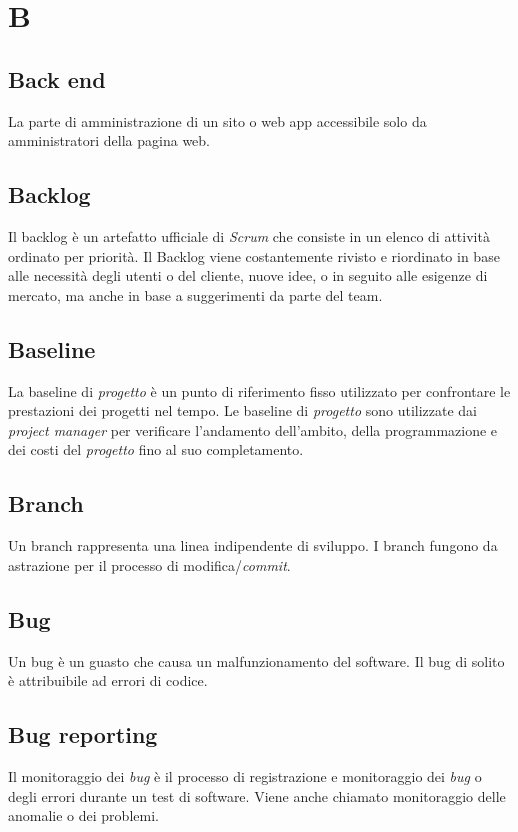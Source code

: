 \chapter{B}
\section{Back end}\label{sec:Back-end}
La parte di amministrazione di un sito o web app accessibile solo da amministratori della pagina web.

\section{Backlog}
Il backlog è un artefatto ufficiale di \emph{Scrum} che consiste in un elenco di attività ordinato per priorità. Il Backlog viene costantemente rivisto e riordinato in base alle necessità degli utenti o del cliente, nuove idee, o in seguito alle esigenze di mercato, ma anche in base a suggerimenti da parte del team.

\section{Baseline}
La baseline di \emph{progetto} è un punto di riferimento fisso utilizzato per confrontare le prestazioni dei progetti nel tempo. Le baseline di \emph{progetto} sono utilizzate dai \emph{project manager} per verificare l'andamento dell'ambito, della programmazione e dei costi del \emph{progetto} fino al suo completamento.

\section{Branch}
Un branch rappresenta una linea indipendente di sviluppo. I branch fungono da astrazione per il processo di modifica/\emph{commit}.

\section{Bug}\label{sec:Bugs}
Un bug è un guasto che causa un malfunzionamento del software. Il bug di solito è attribuibile ad errori di codice.

\section{Bug reporting}
Il monitoraggio dei \emph{bug} è il processo di registrazione e monitoraggio dei \emph{bug} o degli errori durante un test di software. Viene anche chiamato monitoraggio delle anomalie o dei problemi.
